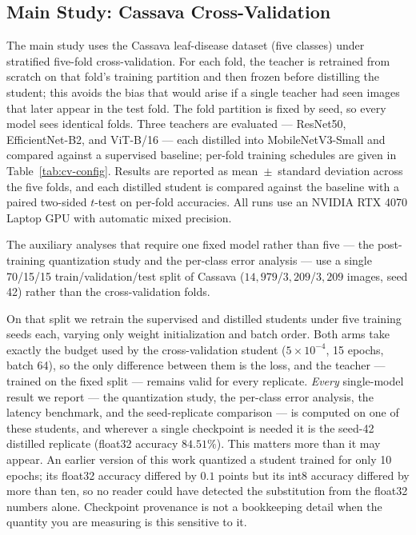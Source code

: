 \documentclass[conference]{IEEEtran}
\begin{document}
\subsection{Main Study: Cassava Cross-Validation}

The main study uses the Cassava leaf-disease dataset (five classes) under
stratified five-fold cross-validation. For each fold, the teacher is retrained
from scratch on that fold's training partition and then frozen before distilling
the student; this avoids the bias that would arise if a single teacher had seen
images that later appear in the test fold. The fold partition is fixed by seed,
so every model sees identical folds. Three teachers are evaluated ---
ResNet50, EfficientNet-B2, and ViT-B/16 --- each distilled into
MobileNetV3-Small and compared against a supervised baseline; per-fold training
schedules are given in Table~\ref{tab:cv-config}. Results are reported as
mean~$\pm$~standard deviation across the five folds, and each distilled student
is compared against the baseline with a paired two-sided $t$-test on per-fold
accuracies. All runs use an NVIDIA RTX 4070 Laptop GPU with automatic mixed precision.

The auxiliary analyses that require one fixed model rather than five --- the
post-training quantization study and the per-class error analysis --- use a
single 70/15/15 train/validation/test split of Cassava
($14{,}979$/$3{,}209$/$3{,}209$ images, seed 42) rather than the cross-validation
folds.

On that split we retrain the supervised and distilled students under five
training seeds each, varying only weight initialization and batch order. Both
arms take exactly the budget used by the cross-validation student
($5\times10^{-4}$, 15 epochs, batch 64), so the only difference between them is
the loss, and the teacher --- trained on the fixed split --- remains valid for
every replicate. \emph{Every} single-model result we report --- the quantization
study, the per-class error analysis, the latency benchmark, and the seed-replicate
comparison --- is computed on one of these students, and wherever a single
checkpoint is needed it is the seed-42 distilled replicate (float32 accuracy
$84.51\%$). This matters more than it may appear. An earlier version of this work
quantized a student trained for only 10 epochs; its float32 accuracy differed by
$0.1$ points but its int8 accuracy differed by more than ten, so no reader could
have detected the substitution from the float32 numbers alone. Checkpoint
provenance is not a bookkeeping detail when the quantity you are measuring is
this sensitive to it.
\end{document}
